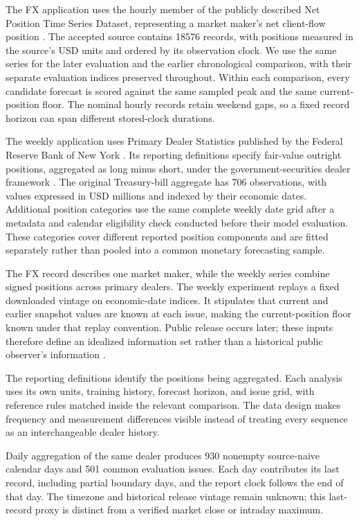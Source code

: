 \documentclass[11pt,a4paper]{article}
\begin{document}
The FX application uses the hourly member of the publicly described Net Position Time Series Dataset, representing a market maker's net client-flow position \citep{dataset,wisniewski2020}. The accepted source contains 18576 records, with positions measured in the source's USD units and ordered by its observation clock. We use the same series for the later evaluation and the earlier chronological comparison, with their separate evaluation indices preserved throughout. Within each comparison, every candidate forecast is scored against the same sampled peak and the same current-position floor. The nominal hourly records retain weekend gaps, so a fixed record horizon can span different stored-clock durations.


The weekly application uses Primary Dealer Statistics published by the Federal Reserve Bank of New York \citep{nyfeddata}. Its reporting definitions specify fair-value outright positions, aggregated as long minus short, under the government-securities dealer framework \citep{fr2004_2013,fr2004_2024}. The original Treasury-bill aggregate has 706 observations, with values expressed in USD millions and indexed by their economic dates. Additional position categories use the same complete weekly date grid after a metadata and calendar eligibility check conducted before their model evaluation. These categories cover different reported position components and are fitted separately rather than pooled into a common monetary forecasting sample.


The FX record describes one market maker, while the weekly series combine signed positions across primary dealers. The weekly experiment replays a fixed downloaded vintage on economic-date indices. It stipulates that current and earlier snapshot values are known at each issue, making the current-position floor known under that replay convention. Public release occurs later; these inputs therefore define an idealized information set rather than a historical public observer's information \citep{nyfeddata}.

The reporting definitions identify the positions being aggregated. Each analysis uses its own units, training history, forecast horizon, and issue grid, with reference rules matched inside the relevant comparison. The data design makes frequency and measurement differences visible instead of treating every sequence as an interchangeable dealer history.

Daily aggregation of the same dealer produces 930 nonempty source-naive calendar days and 501 common evaluation issues. Each day contributes its last record, including partial boundary days, and the report clock follows the end of that day. The timezone and historical release vintage remain unknown; this last-record proxy is distinct from a verified market close or intraday maximum.
\end{document}
